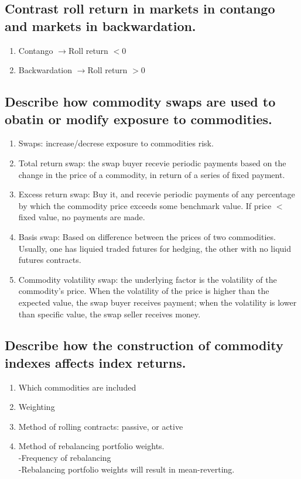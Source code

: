 \documentclass{article}
\newcommand{\be}{\begin{enumerate}}
\newcommand{\ee}{\end{enumerate}}
\newcommand{\ra}{$\rightarrow$}
\begin{document}
\subsection{Contrast roll return in markets in contango and markets in backwardation.}
\be
    \item Contango \ra Roll return $<$0
    \item Backwardation \ra Roll return $>$0
\ee
\subsection{Describe how commodity swaps are used to obatin or modify exposure to commodities.}
\be
    \item Swaps: increase/decrese exposure to commodities risk.
    \item Total return swap: the swap buyer recevie periodic payments based on the change
    in the price of a commodity, in return of a series of fixed payment.
    \item Excess return swap: Buy it, and recevie periodic payments of any percentage
    by which the commodity price exceeds some benchmark value. If price $<$ fixed value, no payments
    are made.
    \item Basis swap: Based on difference between the prices of two commodities. Usually, one has liquied
    traded futures for hedging, the other with no liquid futures contracts.
    \item Commodity volatility swap: the underlying factor is the volatility of the
    commodity's price. When the volatility of the price is higher than the expected value,
    the swap buyer receives payment; when the volatility is lower than specific value, the 
    swap seller receives money.
\ee
\subsection{Describe how the construction of commodity indexes affects index returns.}
\be
    \item Which commodities are included
    \item Weighting
    \item Method of rolling contracts: passive, or active
    \item Method of rebalancing portfolio weights.
        \\-Frequency of rebalancing
        \\-Rebalancing portfolio weights will result in mean-reverting.
\ee
\end{document}
